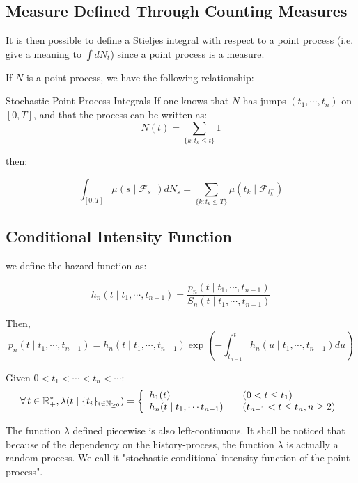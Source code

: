 \documentclass[11pt]{book}
\newcommand{\sequence}[1]{\{ #1 \}_{ i \in \N} }
\begin{document}
\subsection{Measure Defined Through Counting Measures}
It is then possible to define a Stieljes integral with respect to a point process (i.e. give a meaning to $\int dN_t$) since a point process is a measure. 

If $N$ is a point process, we have the following relationship:

\begin{theoreme}[label = eq:sum_prod_equiv]{Stochastic Point Process Integrals}
If one knows that $N$ has jumps $(t_1, \cdots, t_n)$ on $[0,T]$, and that the process can be written as:
\begin{equation}
N(t) = \sum_{ \{ k : t_k \leq t \} } 1 
\end{equation}

then:

\begin{equation}
\int_{[0,T]} \mu(s \mid \mathcal F_{s^-} ) d N_s = \sum_{ \{ k : t_k \leq T \} }\mu(t_k \mid \mathcal F_{t_k^-} ) 
\end{equation}  
\end{theoreme}


\subsection{Conditional Intensity Function}
we define the hazard function as:

$$h_n( t \mid t_1, \cdots, t_{n-1} ) = \frac{ p_n ( t \mid t_1, \cdots, t_{n-1} ) } { S_n ( t \mid t_1, \cdots, t_{n-1} ) }$$

Then, 
$$ p_n ( t \mid t_1, \cdots, t_{n-1} ) =  h_n( t \mid t_1, \cdots, t_{n-1} ) \exp \left ( - \int_{t_{n-1}}^t h_n( u \mid t_1, \cdots, t_{n-1} ) du \right ) $$

\begin{definition}
\label{def:lambda_1}
Given $0 < t_1 < \cdots < t_{n} < \cdots $:
\begin{equation}
\forall t \in \R_+^*, \lambda(t \mid \sequence{ t_i } ) = \left\{
    \begin{array}{ll}
            h_1(t) \quad & (0 < t \leq t_1) \\
            h_n(t \mid t_1, \cdots t_{n-1}) \quad & (t_{n-1} < t \leq t_n, n \geq 2) \\
    \end{array}
\right. 
\end{equation}

The function $\lambda$ defined piecewise is also left-continuous. It shall be noticed that because of the dependency on the history-process, the function $\lambda$ is actually a random process. We call it "stochastic conditional intensity function of the point process". 
\end{definition}
\end{document}
